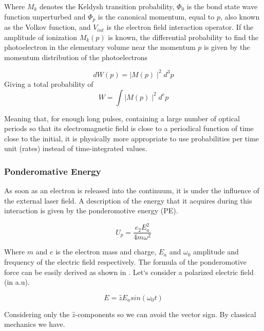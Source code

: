 Where $M_{k}$ denotes the Keldysh transition probability, $\Phi_{0}$ is the bond state wave function unperturbed and $\Phi_{p}$ is the canonical momentum, equal to $p$, also known as the Volkov function, and $V_{int}$ is the electron field interaction operator. If the amplitude of ionization $M_{k}(p)$ is known, the differential probability to find the photoelectron in the elementary volume near the momentum $p$ is given by the momentum distribution of the photoelectrons 

\begin{equation}
dW(p)=\mid M(p)\mid^{2} d^{3}p
\end{equation}
 Giving a total probability of
 \begin{equation}
 W= \int \mid M(p)\mid^{2} d^{e}p
 \end{equation}
 
Meaning that, for enough long pulses, containing a large number of optical periods so that its electromagnetic field is close to a periodical function of time close to the initial, it is physically more appropriate to use probabilities per time unit (rates) instead of time-integrated values.

\subsubsection{Ponderomative Energy}


As soon as an electron is released into the continuum, it is under the influence of the external laser field. A description of the energy that it acquires during this interaction is given by the ponderomotive energy (PE).

\begin{equation}
U_{p} = \dfrac{e_{2}E_{a}^{2}}{4m \omega^{2}}
\end{equation}

Where $m$ and $e$ is the electron mass and charge, $E_{a}$ and $\omega_{0}$  amplitude and frequency of the electric field respectively. The formula of the ponderomotive force can be easily derived as shown in \cite{protopapas_atomic_1997}\cite{connerade_highly_1998}. Let`s consider a polarized electric field (in a.u).

\begin{equation}
E=\widehat{z}E_{a}sin(\omega_{0} t) 
\end{equation}

Considering only the $\widehat{z}$-components so we can avoid the vector sign. By classical mechanics we have.

